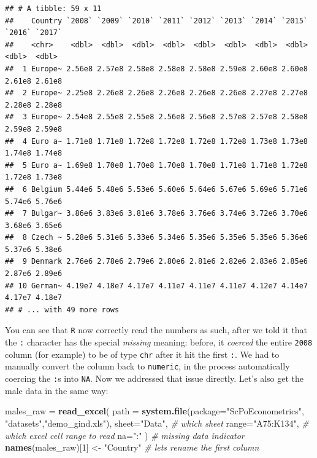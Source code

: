 \documentclass[]{book}
\newenvironment{Shaded}{\begin{snugshade}}{\end{snugshade}}
\newcommand{\KeywordTok}[1]{\textcolor[rgb]{0.13,0.29,0.53}{\textbf{#1}}}
\newcommand{\DataTypeTok}[1]{\textcolor[rgb]{0.13,0.29,0.53}{#1}}
\newcommand{\DecValTok}[1]{\textcolor[rgb]{0.00,0.00,0.81}{#1}}
\newcommand{\StringTok}[1]{\textcolor[rgb]{0.31,0.60,0.02}{#1}}
\newcommand{\CommentTok}[1]{\textcolor[rgb]{0.56,0.35,0.01}{\textit{#1}}}
\newcommand{\NormalTok}[1]{#1}
\begin{document}
\begin{verbatim}
## # A tibble: 59 x 11
##    Country `2008` `2009` `2010` `2011` `2012` `2013` `2014` `2015` `2016` `2017`
##    <chr>    <dbl>  <dbl>  <dbl>  <dbl>  <dbl>  <dbl>  <dbl>  <dbl>  <dbl>  <dbl>
##  1 Europe~ 2.56e8 2.57e8 2.58e8 2.58e8 2.58e8 2.59e8 2.60e8 2.60e8 2.61e8 2.61e8
##  2 Europe~ 2.25e8 2.26e8 2.26e8 2.26e8 2.26e8 2.26e8 2.27e8 2.27e8 2.28e8 2.28e8
##  3 Europe~ 2.54e8 2.55e8 2.55e8 2.56e8 2.56e8 2.57e8 2.57e8 2.58e8 2.59e8 2.59e8
##  4 Euro a~ 1.71e8 1.71e8 1.72e8 1.72e8 1.72e8 1.72e8 1.73e8 1.73e8 1.74e8 1.74e8
##  5 Euro a~ 1.69e8 1.70e8 1.70e8 1.70e8 1.70e8 1.71e8 1.71e8 1.72e8 1.72e8 1.73e8
##  6 Belgium 5.44e6 5.48e6 5.53e6 5.60e6 5.64e6 5.67e6 5.69e6 5.71e6 5.74e6 5.76e6
##  7 Bulgar~ 3.86e6 3.83e6 3.81e6 3.78e6 3.76e6 3.74e6 3.72e6 3.70e6 3.68e6 3.65e6
##  8 Czech ~ 5.28e6 5.31e6 5.33e6 5.34e6 5.35e6 5.35e6 5.35e6 5.36e6 5.37e6 5.38e6
##  9 Denmark 2.76e6 2.78e6 2.79e6 2.80e6 2.81e6 2.82e6 2.83e6 2.85e6 2.87e6 2.89e6
## 10 German~ 4.19e7 4.18e7 4.17e7 4.11e7 4.11e7 4.11e7 4.12e7 4.14e7 4.17e7 4.18e7
## # ... with 49 more rows
\end{verbatim}

You can see that \texttt{R} now correctly read the numbers as such,
after we told it that the \texttt{:} character has the special
\emph{missing} meaning: before, it \emph{coerced} the entire
\texttt{2008} column (for example) to be of type \texttt{chr} after it
hit the first \texttt{:}. We had to manually convert the column back to
\texttt{numeric}, in the process automatically coercing the \texttt{:}s
into \texttt{NA}. Now we addressed that issue directly. Let's also get
the male data in the same way:

\begin{Shaded}
\begin{Highlighting}[]
\NormalTok{males_raw =}\StringTok{ }\KeywordTok{read_excel}\NormalTok{(}
                \DataTypeTok{path =} \KeywordTok{system.file}\NormalTok{(}\DataTypeTok{package=}\StringTok{"ScPoEconometrics"}\NormalTok{,}
                                    \StringTok{"datasets"}\NormalTok{,}\StringTok{"demo_gind.xls"}\NormalTok{), }
                \DataTypeTok{sheet=}\StringTok{"Data"}\NormalTok{, }\CommentTok{# which sheet}
                \DataTypeTok{range=}\StringTok{"A75:K134"}\NormalTok{,  }\CommentTok{# which excel cell range to read}
                \DataTypeTok{na=}\StringTok{":"}\NormalTok{ )   }\CommentTok{# missing data indicator}
\KeywordTok{names}\NormalTok{(males_raw)[}\DecValTok{1}\NormalTok{] <-}\StringTok{ "Country"}   \CommentTok{# lets rename the first column}
\end{Highlighting}
\end{Shaded}
\end{document}

